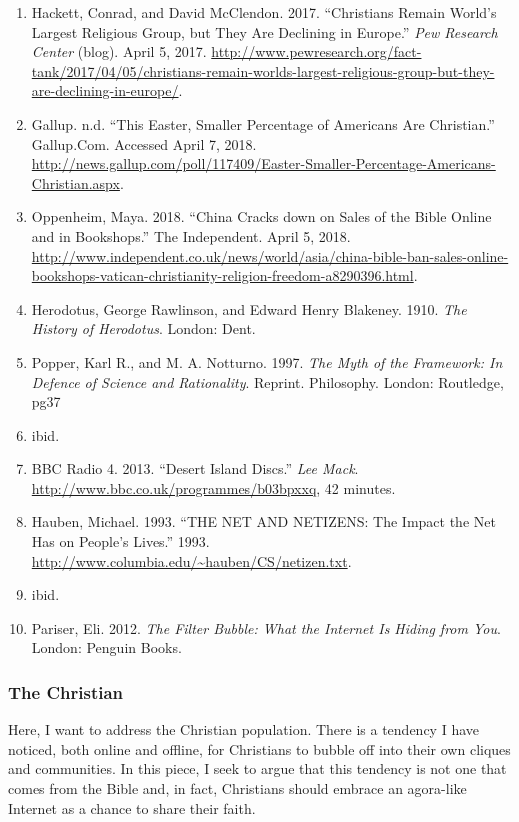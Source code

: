 \documentclass[]{article}
\begin{document}
\begin{enumerate}
\def\labelenumi{\arabic{enumi}.}
\item
  Hackett, Conrad, and David McClendon. 2017. ``Christians Remain
  World's Largest Religious Group, but They Are Declining in Europe.''
  \emph{Pew Research Center} (blog). April 5, 2017.
  \url{http://www.pewresearch.org/fact-tank/2017/04/05/christians-remain-worlds-largest-religious-group-but-they-are-declining-in-europe/}.
\item
  Gallup. n.d. ``This Easter, Smaller Percentage of Americans Are
  Christian.'' Gallup.Com. Accessed April 7, 2018.
  \url{http://news.gallup.com/poll/117409/Easter-Smaller-Percentage-Americans-Christian.aspx}.
\item
  Oppenheim, Maya. 2018. ``China Cracks down on Sales of the Bible
  Online and in Bookshops.'' The Independent. April 5, 2018.
  \url{http://www.independent.co.uk/news/world/asia/china-bible-ban-sales-online-bookshops-vatican-christianity-religion-freedom-a8290396.html}.
\item
  Herodotus, George Rawlinson, and Edward Henry Blakeney. 1910.
  \emph{The History of Herodotus}. London: Dent.
\item
  Popper, Karl R., and M. A. Notturno. 1997. \emph{The Myth of the
  Framework: In Defence of Science and Rationality}. Reprint.
  Philosophy. London: Routledge, pg37
\item
  ibid.
\item
  BBC Radio 4. 2013. ``Desert Island Discs.'' \emph{Lee Mack}.
  \url{http://www.bbc.co.uk/programmes/b03bpxxq}, 42 minutes.
\item
  Hauben, Michael. 1993. ``THE NET AND NETIZENS: The Impact the Net Has
  on People's Lives.'' 1993.
  \url{http://www.columbia.edu/~hauben/CS/netizen.txt}.
\item
  ibid.
\item
  Pariser, Eli. 2012. \emph{The Filter Bubble: What the Internet Is
  Hiding from You}. London: Penguin Books.
\end{enumerate}

\hypertarget{header-n92}{%
\subsubsection{The Christian}\label{header-n92}}

Here, I want to address the Christian population. There is a tendency I
have noticed, both online and offline, for Christians to bubble off into
their own cliques and communities. In this piece, I seek to argue that
this tendency is not one that comes from the Bible and, in fact,
Christians should embrace an agora-like Internet as a chance to share
their faith.
\end{document}
